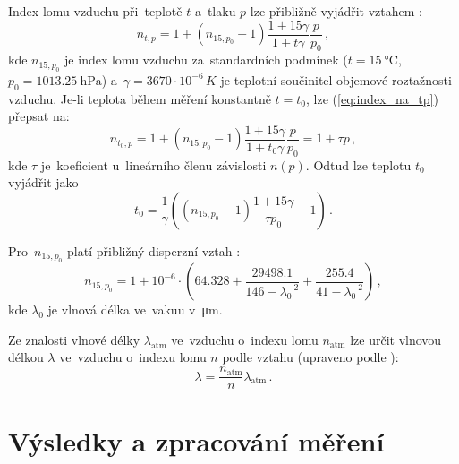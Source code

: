 \documentclass{../concepts/titul_zprava_p/prepareprotokolZprava} %
\begin{document}
Index lomu vzduchu při~teplotě $t$ a~tlaku $p$ lze přibližně vyjádřit vztahem \cite{pokyny}:
\begin{equation}
    \label{eq:index_na_tp}
    n_{t,p} = 1 + \left( n_{15,p_0} - 1 \right) \frac{1+ 15 \gamma}{1 + t \gamma} \frac{p}{p_0}\,,
\end{equation}
kde $n_{15,p_0}$ je index lomu vzduchu za~standardních podmínek ($t=\qty{15}{\degreeCelsius}$, $p_0=\qty{1013.25}{\hecto\pascal}$)
a~$\gamma = 3670\cdot10^{-6}\,\unit{K}$ je teplotní součinitel objemové roztažnosti vzduchu. Je-li
teplota během měření konstantně $t=t_0$, lze (\ref{eq:index_na_tp}) přepsat na:
\begin{equation}
    \label{eq:index_na_p}
    n_{t_0,p} = 1 + \left( n_{15,p_0} - 1 \right) \frac{1+ 15 \gamma}{1 + t_0 \gamma} \frac{p}{p_0} = 1 + \tau p\,,
\end{equation}
kde $\tau$ je~koeficient u~lineárního členu závislosti $n(p)$. Odtud lze teplotu $t_0$ vyjádřit jako
\begin{equation}
    \label{eq:teplota}
    t_0 = \frac{1}{\gamma} \left(\left( n_{15,p_0} - 1 \right) \frac{1+15\gamma}{\tau p_0} - 1\right) \,.
\end{equation}

Pro~$n_{15,p_0}$ platí přibližný disperzní vztah \cite{tabulky}:
\begin{equation}
    \label{eq:n15p0}
    n_{15,p_0} = 1 + 10^{-6} \cdot \left( 64.328 + \frac{29498.1}{146-\lambda_0^{-2}} + 
    \frac{255.4}{41-\lambda_0^{-2}} \right) \,,
\end{equation}
kde $\lambda_0$ je vlnová délka ve~vakuu v~\unit{\micro\meter}.

Ze znalosti vlnové délky $\lambda_\mathrm{atm}$ ve~vzduchu o~indexu lomu $n_\mathrm{atm}$ lze určit vlnovou délkou
$\lambda$ ve~vzduchu o~indexu lomu $n$ podle vztahu (upraveno podle \cite{tabulky}):
\begin{equation}
    \label{eq:lambda_na_n}
    \lambda = \frac{n_\mathrm{atm}}{n} \lambda_\mathrm{atm} \,.
\end{equation}

\section{Výsledky a zpracování měření}

\end{document}
